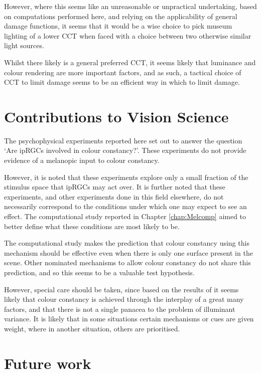 However, where this seems like an unreasonable or unpractical undertaking, based on computations performed here, and relying on the applicability of general damage functions, it seems that it would be a wise choice to pick museum lighting of a lower \gls{CCT} when faced with a choice between two otherwise similar light sources.

Whilst there likely is a general preferred \gls{CCT}, it seems likely that luminance and colour rendering are more important factors, and as such, a tactical choice of \gls{CCT} to limit damage seems to be an efficient way in which to limit damage.

\section{Contributions to Vision Science}

The psychophysical experiments reported here set out to answer the question `Are \glspl{ipRGC} involved in colour constancy?'. These experiments do not provide evidence of a melanopic input to colour constancy. 

However, it is noted that these experiments explore only a small fraction of the stimulus space that \glspl{ipRGC} may act over. It is further noted that these experiments, and other experiments done in this field elsewhere, do not necessarily correspond to the conditions under which one may expect to see an effect. The computational study reported in Chapter \ref{chap:Melcomp} aimed to better define what these conditions are most likely to be.

The computational study makes the prediction that colour constancy using this mechanism should be effective even when there is only one surface present in the scene. Other nominated mechanisms to allow colour constancy do not share this prediction, and so this seems to be a valuable test hypothesis.

However, special care should be taken, since based on the results of \citet{kraft_mechanisms_1999} it seems likely that colour constancy is achieved through the interplay of a great many factors, and that there is not a single panacea to the problem of illuminant variance. It is likely that in some situations certain mechanisms or cues are given weight, where in another situation, others are prioritised.

\section{Future work} \label{sec:fut}

